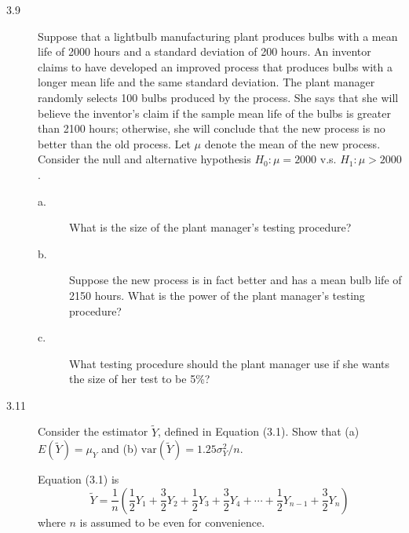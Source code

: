 \documentclass[a4paper,11pt]{article}
\newcommand{\var}{\mathrm{var}}
\begin{document}
\begin{description}
\item[{3.9}] Suppose that a lightbulb manufacturing plant produces bulbs
with a mean life of 2000 hours and a standard deviation of
200 hours. An inventor claims to have developed an improved
process that produces bulbs with a longer mean life and the
same standard deviation. The plant manager randomly selects
100 bulbs produced by the process. She says that she will
believe the inventor's claim if the sample mean life of the
bulbs is greater than 2100 hours; otherwise, she will
conclude that the new process is no better than the old
process. Let \(\mu\) denote the mean of the new process. Consider
the null and alternative hypothesis \(H_0: \mu = 2000\)
v.s. \(H_1: \mu > 2000\).
\begin{description}
\item[{a.}] What is the size of the plant manager's testing procedure?
\item[{b.}] Suppose the new process is in fact better and has a mean
bulb life of 2150 hours. What is the power of the plant
manager's testing procedure?
\item[{c.}] What testing procedure should the plant manager use if she
wants the size of her test to be 5\%?
\end{description}
\end{description}


\begin{description}
\item[{3.11}] Consider the estimator \(\tilde{Y}\), defined in Equation
(3.1). Show that (a) \(E(\tilde{Y}) = \mu_Y\) and (b)
\(\var(\tilde{Y}) = 1.25\sigma^2_Y/n\).

Equation (3.1) is
\[ \tilde{Y} = \frac{1}{n}(\frac{1}{2}Y_1 + \frac{3}{2}Y_2 +
          \frac{1}{2}Y_3 + \frac{3}{2}Y_4 + \cdots +
          \frac{1}{2}Y_{n-1} + \frac{3}{2}Y_n) \]
where \(n\) is assumed to be even for convenience.
\end{description}
\end{document}
